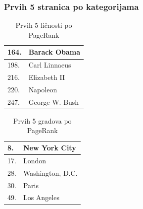 \documentclass[11pt]{beamer}
\begin{document}
\begin{frame}
     \frametitle{Prvih 5 stranica po kategorijama}
        \begin{table}[]
\large
\centering
    \begin{tabular}{|l|l|}
    \hline
    164.                 & Barack Obama                            \\ \hline
    198.                 & Carl Linnaeus \\ \hline
    216.                 & Elizabeth II                \\ \hline
    220.                 & Napoleon                     \\ \hline
    247.                 & George W. Bush \\ \hline
    \end{tabular}
    \caption{Prvih 5 ličnosti po PageRank}
    \label{tabelalicnosti5}
    \end{table}

    \begin{table}[]
    \large
    \centering
    \begin{tabular}{|l|l|}
    \hline
    8.                 & New York City                            \\ \hline
    17.                 & London                         \\ \hline
    28.                 & Washington, D.C.                \\ \hline
    30.                 & Paris                     \\ \hline
    49.                 & Los Angeles \\ \hline
    \end{tabular}
    \caption{Prvih 5 gradova po PageRank}
    \label{tabelagradova5}
    \end{table}
\end{frame}
\end{document}
